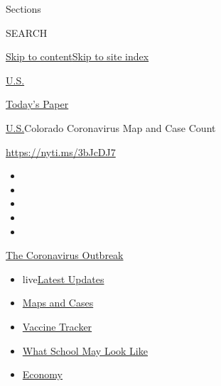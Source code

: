Sections

SEARCH

\protect\hyperlink{site-content}{Skip to
content}\protect\hyperlink{site-index}{Skip to site index}

\href{https://www.nytimes.com/section/us}{U.S.}

\href{https://myaccount.nytimes.com/auth/login?response_type=cookie\&client_id=vi}{}

\href{https://www.nytimes.com/section/todayspaper}{Today's Paper}

\href{/section/us}{U.S.}\textbar{}Colorado Coronavirus Map and Case
Count

\url{https://nyti.ms/3bJcDJ7}

\begin{itemize}
\item
\item
\item
\item
\item
\end{itemize}

\href{https://www.nytimes.com/news-event/coronavirus?action=click\&pgtype=Article\&state=default\&region=TOP_BANNER\&context=storylines_menu}{The
Coronavirus Outbreak}

\begin{itemize}
\tightlist
\item
  live\href{https://www.nytimes.com/2020/08/01/world/coronavirus-covid-19.html?action=click\&pgtype=Article\&state=default\&region=TOP_BANNER\&context=storylines_menu}{Latest
  Updates}
\item
  \href{https://www.nytimes.com/interactive/2020/us/coronavirus-us-cases.html?action=click\&pgtype=Article\&state=default\&region=TOP_BANNER\&context=storylines_menu}{Maps
  and Cases}
\item
  \href{https://www.nytimes.com/interactive/2020/science/coronavirus-vaccine-tracker.html?action=click\&pgtype=Article\&state=default\&region=TOP_BANNER\&context=storylines_menu}{Vaccine
  Tracker}
\item
  \href{https://www.nytimes.com/interactive/2020/07/29/us/schools-reopening-coronavirus.html?action=click\&pgtype=Article\&state=default\&region=TOP_BANNER\&context=storylines_menu}{What
  School May Look Like}
\item
  \href{https://www.nytimes.com/live/2020/07/31/business/stock-market-today-coronavirus?action=click\&pgtype=Article\&state=default\&region=TOP_BANNER\&context=storylines_menu}{Economy}
\end{itemize}

